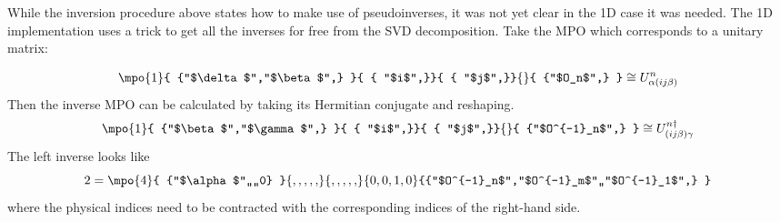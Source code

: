 

While the inversion procedure above states how to make use of pseudoinverses, it was not yet clear in the 1D case it was needed. The 1D implementation uses a trick to get all the inverses for free from the SVD decomposition. Take the MPO which corresponds to a unitary matrix:




\begin{equation}
    \mpo{1}{ {"$\delta$","$\beta$",}  }{ { "$i$",}}{ { "$j$",}}{}{ {"$O_n$",} } \cong U^{n}_{\alpha (i j \beta)}
\end{equation}
Then the inverse MPO can be calculated by taking its Hermitian conjugate and reshaping.
\begin{equation}
    \mpo{1}{ {"$\beta$","$\gamma$",}  }{ { "$i$",}}{ { "$j$",}}{}{ {"$O^{-1}_n$",} } \cong U^{n \dagger}_{ (i j \beta)  \gamma }
\end{equation}
The left inverse looks like
\begin{equation}
    2 =  \mpo{4}{ {"$\alpha$",,,,0}  }{ {,,,,,}}{ { ,,,,,}}{{0,0,1,0}}{{"$O^{-1}_n$","$O^{-1}_m$",,"$O^{-1}_1$",} }
\end{equation}
where the physical indices need to be contracted with the corresponding indices of the right-hand side.

